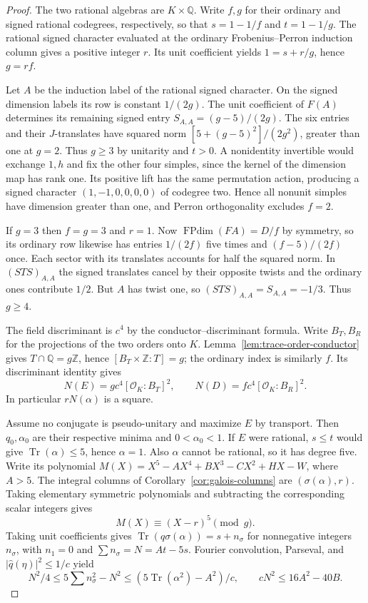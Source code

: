 \documentclass[11pt,reqno]{amsart}
\theoremstyle{remark}\newtheorem{remark}[theorem]{Remark}
\numberwithin{equation}{section}
\begin{document}
\begin{proof}
The two rational algebras are $K\times\mathbb Q$. Write $f,g$ for
their ordinary and signed rational codegrees, respectively, so that
$s=1-1/f$ and $t=1-1/g$. The rational signed character evaluated at
the ordinary Frobenius--Perron induction column gives a positive
integer $r$. Its unit coefficient yields $1=s+r/g$, hence $g=rf$.

Let $A$ be the induction label of the rational signed character.
On the signed dimension labels its row is constant $1/(2g)$.
The unit coefficient of $F(A)$ determines its remaining signed
entry $S_{A,A}=(g-5)/(2g)$. The six entries and their $J$-translates
have squared norm $[5+(g-5)^2]/(2g^2)$, greater than one at $g=2$.
Thus $g\ge3$ by unitarity and $t>0$. A nonidentity invertible would
exchange $1,h$ and fix the other four simples, since the kernel of
the dimension map has rank one. Its positive lift has the same
permutation action, producing a signed character $(1,-1,0,0,0,0)$
of codegree two. Hence all nonunit simples have dimension greater
than one, and Perron orthogonality excludes $f=2$.

If $g=3$ then $f=g=3$ and $r=1$. Now $\operatorname{FPdim}(FA)=D/f$
by symmetry, so its ordinary row likewise has entries $1/(2f)$ five
times and $(f-5)/(2f)$ once. Each sector with its translates accounts
for half the squared norm. In $(STS)_{A,A}$ the signed translates
cancel by their opposite twists and the ordinary ones contribute $1/2$.
But $A$ has twist one, so $(STS)_{A,A}=S_{A,A}=-1/3$. Thus $g\ge4$.

The field discriminant is $c^4$ by the conductor--discriminant
formula. Write $B_T,B_R$ for the projections of the two orders onto
$K$. Lemma~\ref{lem:trace-order-conductor} gives
$T\cap\mathbb Q=g\mathbb Z$, hence $[B_T\times\mathbb Z:T]=g$;
the ordinary index is similarly $f$. Its discriminant identity gives
\[
 N(E)=gc^4[\mathcal O_K:B_T]^2,\qquad
 N(D)=fc^4[\mathcal O_K:B_R]^2.
\]
In particular $rN(\alpha)$ is a square.

Assume no conjugate is pseudo-unitary and maximize $E$ by transport.
Then $q_0,\alpha_0$ are their respective minima and $0<\alpha_0<1$.
If $E$ were rational, $s\le t$ would give
$\operatorname{Tr}(\alpha)\le5$, hence $\alpha=1$. Also $\alpha$
cannot be rational, so it has degree five. Write its polynomial
$M(X)=X^5-AX^4+BX^3-CX^2+HX-W$, where $A>5$.
The integral columns of Corollary~\ref{cor:galois-columns}
are $(\sigma(\alpha),r)$. Taking
elementary symmetric polynomials and subtracting the corresponding
scalar integers gives
\[
 M(X)\equiv(X-r)^5\pmod g.
\]
Taking unit coefficients gives
$\operatorname{Tr}(q\sigma(\alpha))=s+n_\sigma$ for nonnegative
integers $n_\sigma$, with $n_1=0$ and $\sum n_\sigma=N=At-5s$.
Fourier convolution, Parseval, and $|\widehat q(\eta)|^2\le1/c$
yield
\[
 N^2/4\le5\textstyle\sum n_\sigma^2-N^2
 \le(5\operatorname{Tr}(\alpha^2)-A^2)/c,
 \qquad cN^2\le16A^2-40B.
\]


\end{proof}
\end{document}
